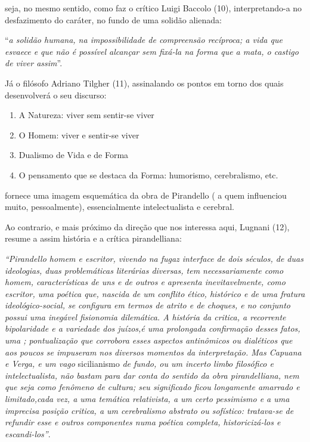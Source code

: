 seja, no mesmo sentido, como faz o crítico Luigi Baccolo (10),
interpretando-a no desfazimento do caráter, no fundo de uma solidão
alienada:

``\emph{a solidão humana, na impossibilidade de compreensão recíproca; a
vida que esvaece e que não é possível alcançar sem fixá-la na forma que
a mata, o castigo de viver assim}''.

Já o filósofo Adriano Tilgher (11), assinalando os pontos em torno dos
quais desenvolverá o seu discurso:

\begin{enumerate}
\def\labelenumi{\arabic{enumi}.}
\item
  A Natureza: viver sem sentir-se viver
\item
  O Homem: viver e sentir-se viver
\item
  Dualismo de Vida e de Forma
\item
  O pensamento que se destaca da Forma: humorismo, cerebralismo, etc.
\end{enumerate}

fornece uma imagem esquemática da obra de Pirandello ( a quem
influenciou muito, pessoalmente), essencialmente intelectualista e
cerebral.

Ao contrario, e mais próximo da direção que nos interessa aqui, Lugnani
(12), resume a assim história e a crítica pirandelliana:

\emph{``Pirandello homem e escritor, vivendo na fugaz interface de dois
séculos, de duas ideologias, duas problemáticas literárias diversas, tem
necessariamente como homem, características de uns e de outros e
apresenta inevitavelmente, como escritor, uma poética que, nascida de um
conflito ético, histórico e de uma fratura ideológico-social, se
configura em termos de atrito e de choques, e no conjunto possui uma
inegável fisionomia dilemática. A história da critica, a recorrente
bipolaridade e a variedade dos juízos,é uma prolongada confirmação
desses fatos, uma ; pontualização que corrobora esses aspectos
antinômicos ou dialéticos que aos poucos se impuseram nos diversos
momentos da interpretação. Mas Capuana e Verga, e um vago} sicilianismo
\emph{de fundo, ou um incerto limbo filosófico e intelectualista, não
bastam para dar conta do sentido da obra pirandelliana, nem que seja
como fenômeno de cultura; seu significado ficou longamente amarrado e
limitado,cada vez, a uma temática relativista, a um certo pessimismo e a
uma imprecisa posição critica, a um cerebralismo abstrato ou sofístico:
tratava-se de refundir esse e outros componentes numa poética completa,
historicizá-los e escandi-los''}.

